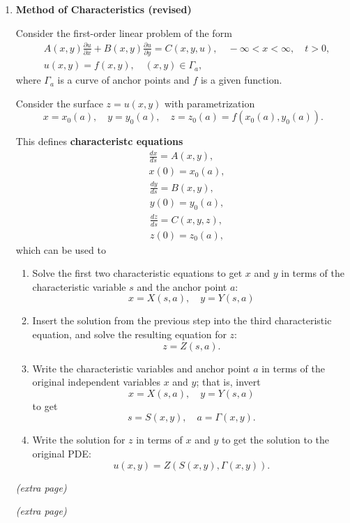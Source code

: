\begin{enumerate}
\item \textbf{Method of Characteristics (revised)}

Consider the first-order linear problem of the form
\[
\begin{aligned}
    & A(x,y)\frac{\partial u}{\partial x} + B(x,y)\frac{\partial u}{\partial y} = C(x,y,u) , \quad -\infty<x<\infty, \quad t>0, \\
    & u(x,y)=f(x,y), \quad (x,y)\in \Gamma_{a},
\end{aligned}
\]
where $\Gamma_{a}$ is a curve of anchor points and $f$ is a given function.

Consider the surface $z=u(x,y)$ with parametrization
\[x=x_{0}(a),\quad y=y_{0}(a), \quad z=z_{0}(a)=f(x_{0}(a), y_{0}(a)).\]

This defines \textbf{characteristc equations}
\[
\begin{aligned}
    & \frac{d x}{d s} = A(x,y),\\
    & x(0)=x_{0}(a),
\end{aligned}
\]
\[
\begin{aligned}
    & \frac{d y}{d s} = B(x,y),\\
    & y(0)=y_{0}(a),
\end{aligned}
\]
\[
\begin{aligned}
    & \frac{d z}{d s} = C(x,y,z),\\
    & z(0)=z_{0}(a),
\end{aligned}
\]
which can be used to 
\begin{enumerate}
    \item Solve the first two characteristic equations to get $x$ and $y$ in terms of the characteristic variable $s$ and the anchor point $a$:
    \[x=X(s,a), \quad y=Y(s,a)\]
    \item Insert the solution from the previous step into the third characteristic equation, and solve
    the resulting equation for $z$:
    \[z=Z(s,a).\]
    \item Write the characteristic variables and anchor point $a$ in terms of the original independent variables $x$ and $y$; that is, invert
    \[x=X(s,a), \quad y=Y(s,a)\]
    to get
    \[s=S(x,y), \quad a=\Gamma(x,y).\]
    \item Write the solution for $z$ in terms of $x$ and $y$ to get the solution to the original PDE:
    \[u(x,y)=Z(S(x,y), \Gamma(x,y)).\]
\end{enumerate}

\newpage


\textit{(extra page)}

\newpage

\textit{(extra page)}



\end{enumerate}

